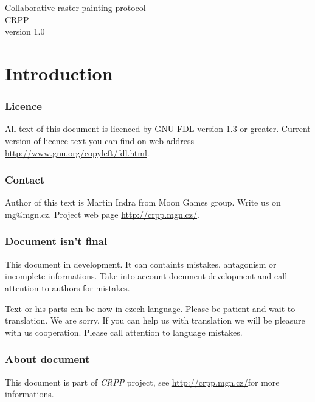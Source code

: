 \documentclass[12pt,oneside,a4paper]{report}
\newcommand{\webURL}{\url{http://crpp.mgn.cz/}}
\begin{document}
\thispagestyle{empty}
\begin{center}

{\Huge Collaborative raster painting protocol}\\[50pt]

{\Huge CRPP}\\[100pt]

{\Large version 1.0}

\end{center}
\newpage

\tableofcontents
\newpage

\part{Introduction}

\section{Licence}

All text of this document is licenced by GNU FDL version 1.3 or greater. Current version of licence text you can find on web address \url{http://www.gnu.org/copyleft/fdl.html}.

\section{Contact}

Author of this text is Martin Indra from Moon Games group. Write us on mg@mgn.cz. Project web page \webURL{}.

\section{Document isn't final}

This document in development. It can containts mistakes, antagonism or incomplete informations. Take into account document development and call attention to authors for mistakes.

Text or his parts can be now in czech language. Please be patient and wait to translation. We are sorry. If you can help us with translation we will be pleasure with us cooperation. Please call attention to language mistakes.

\section{About document}

This document is part of \emph{CRPP} project, see \webURL for more informations.
\end{document}

